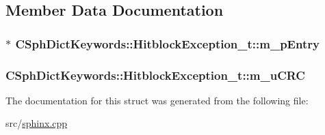 \subsection{Member Data Documentation}
\hypertarget{structCSphDictKeywords_1_1HitblockException__t_aebee3f07670fd01bb08dda3335d90fdd}{
\subsubsection[{m\-\_\-p\-Entry}]{$\ast$ C\-Sph\-Dict\-Keywords\-::\-Hitblock\-Exception\-\_\-t\-::m\-\_\-p\-Entry}}\label{structCSphDictKeywords_1_1HitblockException__t_aebee3f07670fd01bb08dda3335d90fdd}
\hypertarget{structCSphDictKeywords_1_1HitblockException__t_a40654ae25cd6b66248f48939b92e7a86}{
\subsubsection[{m\-\_\-u\-C\-R\-C}]{ C\-Sph\-Dict\-Keywords\-::\-Hitblock\-Exception\-\_\-t\-::m\-\_\-u\-C\-R\-C}}\label{structCSphDictKeywords_1_1HitblockException__t_a40654ae25cd6b66248f48939b92e7a86}


The documentation for this struct was generated from the following file\-:\begin{DoxyCompactItemize}
\item 
src/\hyperlink{sphinx_8cpp}{sphinx.\-cpp}\end{DoxyCompactItemize}
